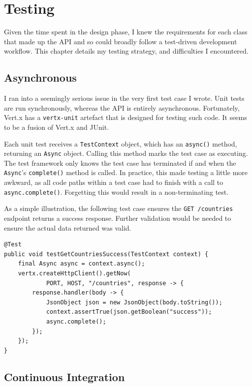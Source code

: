 \documentclass[12pt,a4paper]{bhamdissertation}
\newcommand{\code}[1]{\texttt{#1}}
\begin{document}
\chapter{Testing} \label{testing}

Given the time spent in the design phase, I knew the requirements for each class that made up the API and so could broadly follow a test-driven development workflow. This chapter details my testing strategy, and difficulties I encountered.

\section{Asynchronous}

I ran into a seemingly serious issue in the very first test case I wrote. Unit tests are run synchronously, whereas the API is entirely asynchronous. Fortunately, Vert.x has a \code{vertx-unit} artefact that is designed for testing such code. It seems to be a fusion of Vert.x and JUnit.

Each unit test receives a \code{TestContext} object, which has an \code{async()} method, returning an \code{Async} object. Calling this method marks the test case as executing. The test framework only knows the test case has terminated if and when the \code{Async}'s \code{complete()} method is called. In practice, this made testing a little more awkward, as all code paths within a test case had to finish with a call to \code{async.complete()}. Forgetting this would result in a non-terminating test.

As a simple illustration, the following test case ensures the \code{GET /countries} endpoint returns a success response. Further validation would be needed to ensure the actual data returned was valid.

\begin{verbatim}
@Test
public void testGetCountriesSuccess(TestContext context) {
    final Async async = context.async();
    vertx.createHttpClient().getNow(
            PORT, HOST, "/countries", response -> {
        response.handler(body -> {
            JsonObject json = new JsonObject(body.toString());
            context.assertTrue(json.getBoolean("success"));
            async.complete();
        });
    });
}
\end{verbatim}

\section{Continuous Integration}
\end{document}
